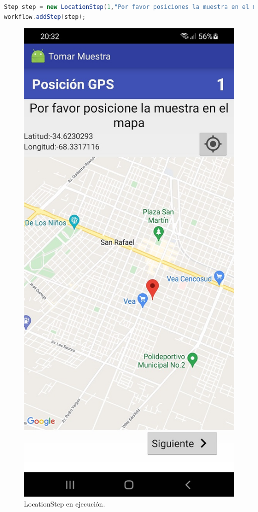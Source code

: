 \begin{lstlisting}[language=Java, frame=tlbr, caption=LocationStep en Java.]	
Step step = new LocationStep(1,"Por favor posiciones la muestra en el mapa",2);
workflow.addStep(step);
\end{lstlisting}



\begin{figure}[H]
  \centering
    \includegraphics[scale=0.3]{50-anexos/C-steps/location_screen.jpg} 
    \caption{LocationStep en ejecución.}
\end{figure}

